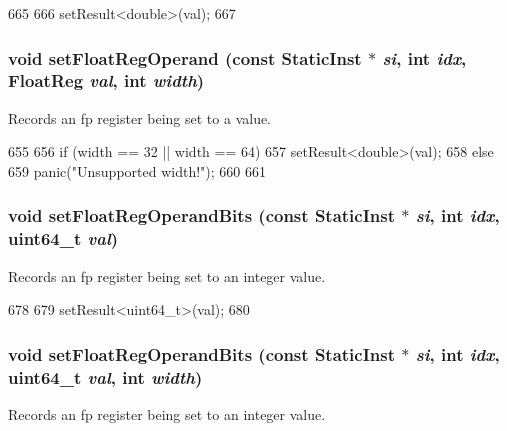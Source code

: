 \begin{DoxyCode}
665     {
666         setResult<double>(val);
667     }
\end{DoxyCode}
\hypertarget{classBaseDynInst_a2cce6f570bd24e9b78535c5f3bf3746f}{
\subsubsection[{setFloatRegOperand}]{\setlength{\rightskip}{0pt plus 5cm}void setFloatRegOperand (const {\bf StaticInst} $\ast$ {\em si}, \/  int {\em idx}, \/  {\bf FloatReg} {\em val}, \/  int {\em width})}}
\label{classBaseDynInst_a2cce6f570bd24e9b78535c5f3bf3746f}
Records an fp register being set to a value. 


\begin{DoxyCode}
655     {
656         if (width == 32 || width == 64) {
657             setResult<double>(val);
658         } else {
659             panic("Unsupported width!");
660         }
661     }
\end{DoxyCode}
\hypertarget{classBaseDynInst_acede5db0b5bbd5e03f6fb096c7ccf1b6}{
\subsubsection[{setFloatRegOperandBits}]{\setlength{\rightskip}{0pt plus 5cm}void setFloatRegOperandBits (const {\bf StaticInst} $\ast$ {\em si}, \/  int {\em idx}, \/  uint64\_\-t {\em val})}}
\label{classBaseDynInst_acede5db0b5bbd5e03f6fb096c7ccf1b6}
Records an fp register being set to an integer value. 


\begin{DoxyCode}
678     {
679         setResult<uint64_t>(val);
680     }
\end{DoxyCode}
\hypertarget{classBaseDynInst_ad3fddac379ba976d902adbf2786afbda}{
\subsubsection[{setFloatRegOperandBits}]{\setlength{\rightskip}{0pt plus 5cm}void setFloatRegOperandBits (const {\bf StaticInst} $\ast$ {\em si}, \/  int {\em idx}, \/  uint64\_\-t {\em val}, \/  int {\em width})}}
\label{classBaseDynInst_ad3fddac379ba976d902adbf2786afbda}
Records an fp register being set to an integer value. 


